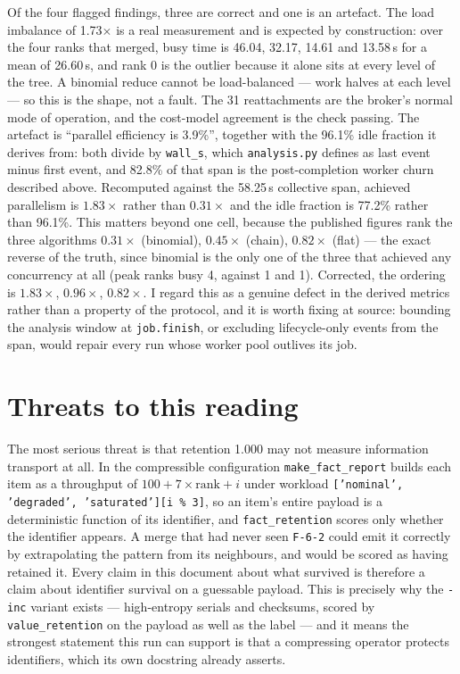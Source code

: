 \documentclass[11pt]{article}
\begin{document}
Of the four flagged findings, three are correct and one is an artefact. The load
imbalance of 1.73$\times$ is a real measurement and is expected by construction: over the
four ranks that merged, busy time is 46.04, 32.17, 14.61 and 13.58\,s for a mean of
26.60\,s, and rank 0 is the outlier because it alone sits at every level of the tree. A
binomial reduce cannot be load-balanced --- work halves at each level --- so this is the
shape, not a fault. The 31 reattachments are the broker's normal mode of operation, and
the cost-model agreement is the check passing. The artefact is ``parallel efficiency is
3.9\%'', together with the 96.1\% idle fraction it derives from: both divide by
\texttt{wall\_s}, which \texttt{analysis.py} defines as
last event minus first event, and 82.8\% of that span is the post-completion worker
churn described above. Recomputed against the 58.25\,s collective span, achieved
parallelism is $1.83\times$ rather than $0.31\times$ and the idle fraction is 77.2\%
rather than 96.1\%. This matters beyond one cell, because the published figures rank the
three algorithms $0.31\times$ (binomial), $0.45\times$ (chain), $0.82\times$ (flat) ---
the exact reverse of the truth, since binomial is the only one of the three that
achieved any concurrency at all (peak ranks busy 4, against 1 and 1). Corrected, the
ordering is $1.83\times$, $0.96\times$, $0.82\times$. I regard this as a genuine defect
in the derived metrics rather than a property of the protocol, and it is worth fixing at
source: bounding the analysis window at \texttt{job.finish}, or excluding lifecycle-only
events from the span, would repair every run whose worker pool outlives its job.

\section{Threats to this reading}

The most serious threat is that retention 1.000 may not measure information transport
at all. In the compressible configuration \texttt{make\_fact\_report} builds each item
as a throughput of $100 + 7 \times \text{rank} + i$ under workload
\texttt{['nominal', 'degraded', 'saturated'][i \% 3]}, so an item's entire payload is a
deterministic function of its identifier, and \texttt{fact\_retention} scores only
whether the identifier appears. A merge that had never seen \texttt{F-6-2} could emit it
correctly by extrapolating the pattern from its neighbours, and would be scored as
having retained it. Every claim in this document about what survived is therefore a
claim about identifier survival on a guessable payload. This is precisely why the
\texttt{-inc} variant exists --- high-entropy serials and checksums, scored by
\texttt{value\_retention} on the payload as well as the label --- and it means the
strongest statement this run can support is that a compressing operator protects
identifiers, which its own docstring already asserts.
\end{document}
